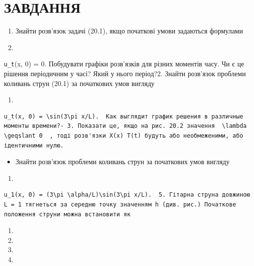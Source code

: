 \documentclass[
  ukrainian,
]{article}
\providecommand{\tightlist}{%
  \setlength{\itemsep}{0pt}\setlength{\parskip}{0pt}}
\begin{document}
\section{ЗАВДАННЯ}\label{ux437ux430ux432ux434ux430ux43dux43dux44f}

\begin{enumerate}
\def\labelenumi{\arabic{enumi}.}
\item
  Знайти розв'язок задачі (20.1), якщо початкові умови задаються
  формулами
\item
\end{enumerate}

\texttt{u\_t}(x, 0) = 0. Побудувати графіки розв'язків для різних
моментів часу. Чи є це рішення періодичним у часі? Який у нього
період?2. Знайти розв'язок проблеми коливань струн (20.1) за початкових
умов вигляду

\begin{enumerate}
\def\labelenumi{\arabic{enumi}.}
\setcounter{enumi}{10}
\tightlist
\item
\end{enumerate}

\begin{verbatim}
u_t(x, 0) = \sin(3\pi x/L).  Как выглядит график решения в различные моменты времени?- 3. Показати це, якщо на рис. 20.2 значення  \lambda \geqslant 0  , тоді розв'язки X(x) T(t) будуть або необмеженими, або ідентичними нулю.
\end{verbatim}

\begin{itemize}
\tightlist
\item
  Знайти розв'язок проблеми коливань струн за початкових умов вигляду
\end{itemize}

\begin{enumerate}
\def\labelenumi{\arabic{enumi}.}
\setcounter{enumi}{11}
\tightlist
\item
\end{enumerate}

\begin{verbatim}
u_1(x, 0) = (3\pi \alpha/L)\sin(3\pi x/L).  5. Гітарна струна довжиною L = 1 тягнеться за середню точку значенням h (див. рис.) Початкове положення струни можна встановити як
\end{verbatim}

\begin{enumerate}
\def\labelenumi{\arabic{enumi}.}
\setcounter{enumi}{12}
\tightlist
\item
\item
\item
\item
\end{enumerate}
\end{document}
